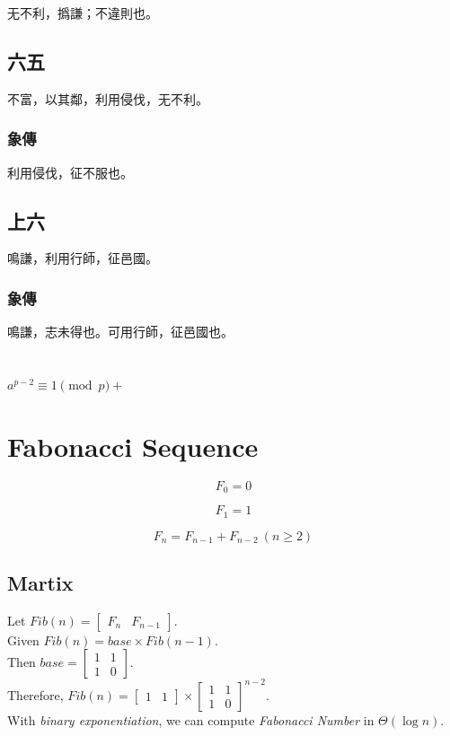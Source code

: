 \documentclass[12pt, a4paper]{article}
\begin{document}
无不利，撝謙；不違則也。

\subsection{六五}

不富，以其鄰，利用侵伐，无不利。

\subsubsection{象傳}

利用侵伐，征不服也。

\subsection{上六}

鳴謙，利用行師，征邑國。

\subsubsection{象傳}

鳴謙，志未得也。可用行師，征邑國也。

\section{}

$a^{p - 2} \equiv 1 \pmod p+$

\section{Fabonacci Sequence}

\[
	F_0 = 0
\]

\[
	F_1 = 1
\]

\[
	F_n = F_{n-1} + F_{n-2}\ (n \geq 2)
\]

\subsection{Martix}

Let $Fib(n) = \begin{bmatrix} F_n & F_{n-1}\end{bmatrix}$.\\[1cm]
Given $Fib(n) = base \times Fib(n-1)$.\\[1em]
Then $base = \begin{bmatrix} 1 & 1 \\ 1 & 0\end{bmatrix}$.\\
Therefore, $Fib(n) = \begin{bmatrix} 1 & 1\end{bmatrix} \times \begin{bmatrix} 1 & 1 \\ 1 & 0\end{bmatrix}^{n-2}$.\\[10pt]
With \textsl{binary exponentiation}, we can compute \textit{Fabonacci Number} in $\Theta(\log n)$.
\end{document}
